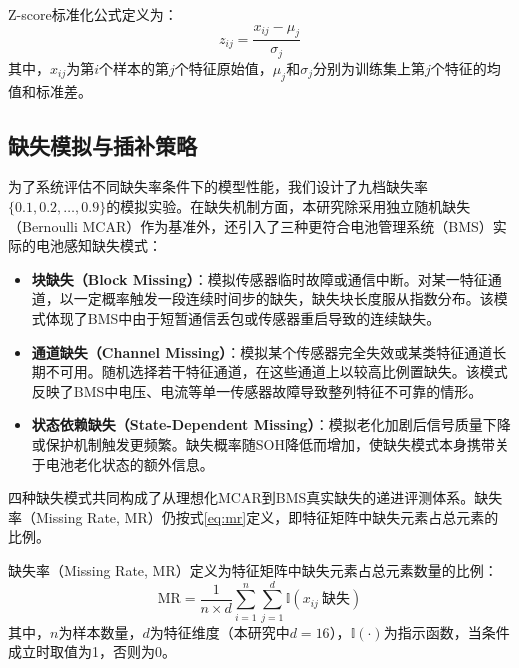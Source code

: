 \documentclass[10pt,a4paper]{ctexart}
\begin{document}
Z-score标准化公式定义为：
\begin{equation}
    z_{ij} = \frac{x_{ij} - \mu_j}{\sigma_j}
\end{equation}
其中，$x_{ij}$为第$i$个样本的第$j$个特征原始值，$\mu_j$和$\sigma_j$分别为训练集上第$j$个特征的均值和标准差。

\subsection{缺失模拟与插补策略}

为了系统评估不同缺失率条件下的模型性能，我们设计了九档缺失率$\{0.1, 0.2, \ldots, 0.9\}$的模拟实验。在缺失机制方面，本研究除采用独立随机缺失（Bernoulli MCAR）作为基准外，还引入了三种更符合电池管理系统（BMS）实际的电池感知缺失模式：

\begin{itemize}[leftmargin=2em]
    \item \textbf{块缺失（Block Missing）}：模拟传感器临时故障或通信中断。对某一特征通道，以一定概率触发一段连续时间步的缺失，缺失块长度服从指数分布。该模式体现了BMS中由于短暂通信丢包或传感器重启导致的连续缺失。
    \item \textbf{通道缺失（Channel Missing）}：模拟某个传感器完全失效或某类特征通道长期不可用。随机选择若干特征通道，在这些通道上以较高比例置缺失。该模式反映了BMS中电压、电流等单一传感器故障导致整列特征不可靠的情形。
    \item \textbf{状态依赖缺失（State-Dependent Missing）}：模拟老化加剧后信号质量下降或保护机制触发更频繁。缺失概率随SOH降低而增加，使缺失模式本身携带关于电池老化状态的额外信息。
\end{itemize}

四种缺失模式共同构成了从理想化MCAR到BMS真实缺失的递进评测体系。缺失率（Missing Rate, MR）仍按式\ref{eq:mr}定义，即特征矩阵中缺失元素占总元素的比例。

缺失率（Missing Rate, MR）定义为特征矩阵中缺失元素占总元素数量的比例：
\begin{equation}
    \text{MR} = \frac{1}{n \times d} \sum_{i=1}^{n}\sum_{j=1}^{d} \mathbb{I}(x_{ij}\ \text{缺失})
    \label{eq:mr}
\end{equation}
其中，$n$为样本数量，$d$为特征维度（本研究中$d=16$），$\mathbb{I}(\cdot)$为指示函数，当条件成立时取值为1，否则为0。
\end{document}

